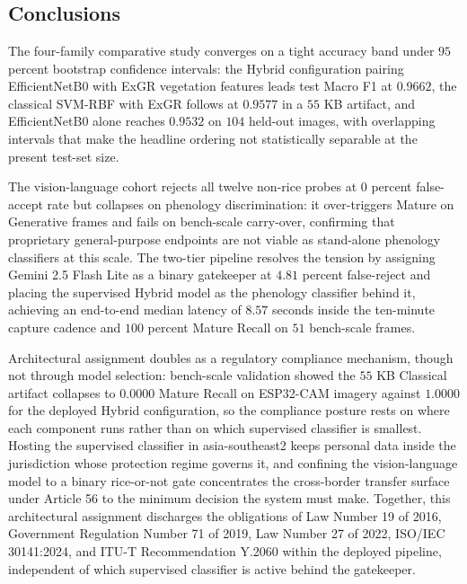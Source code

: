 \chapter{\babLima}

\section{Conclusions}

The four-family comparative study converges on a tight accuracy band under $95$ percent bootstrap confidence intervals: the Hybrid configuration pairing EfficientNetB0 with ExGR vegetation features leads test Macro F1 at $0.9662$, the classical SVM-RBF with ExGR follows at $0.9577$ in a $55$ KB artifact, and EfficientNetB0 alone reaches $0.9532$ on $104$ held-out images, with overlapping intervals that make the headline ordering not statistically separable at the present test-set size.

The vision-language cohort rejects all twelve non-rice probes at $0$ percent false-accept rate but collapses on phenology discrimination: it over-triggers Mature on Generative frames and fails on bench-scale carry-over, confirming that proprietary general-purpose endpoints are not viable as stand-alone phenology classifiers at this scale. The two-tier pipeline resolves the tension by assigning Gemini 2.5 Flash Lite as a binary gatekeeper at $4.81$ percent false-reject and placing the supervised Hybrid model as the phenology classifier behind it, achieving an end-to-end median latency of $8.57$ seconds inside the ten-minute capture cadence and $100$ percent Mature Recall on $51$ bench-scale frames.

Architectural assignment doubles as a regulatory compliance mechanism, though not through model selection: bench-scale validation showed the $55$ KB Classical artifact collapses to $0.0000$ Mature Recall on ESP32-CAM imagery against $1.0000$ for the deployed Hybrid configuration, so the compliance posture rests on where each component runs rather than on which supervised classifier is smallest. Hosting the supervised classifier in asia-southeast2 keeps personal data inside the jurisdiction whose protection regime governs it, and confining the vision-language model to a binary rice-or-not gate concentrates the cross-border transfer surface under Article 56 to the minimum decision the system must make. Together, this architectural assignment discharges the obligations of Law Number 19 of 2016, Government Regulation Number 71 of 2019, Law Number 27 of 2022, ISO/IEC 30141:2024, and ITU-T Recommendation Y.2060 within the deployed pipeline, independent of which supervised classifier is active behind the gatekeeper.


